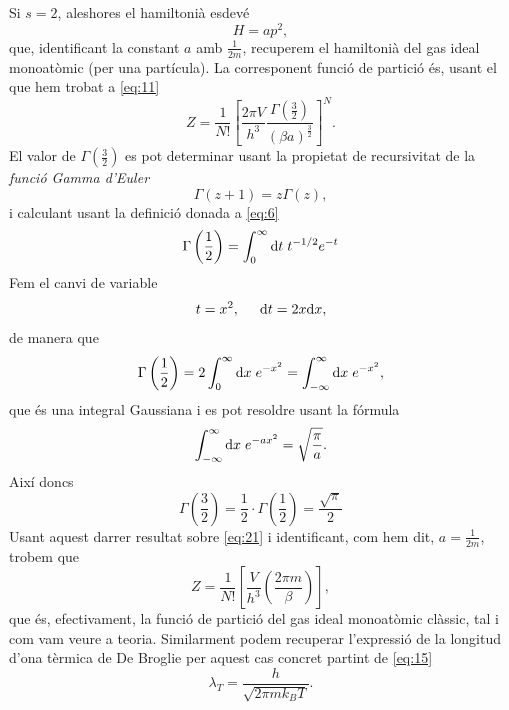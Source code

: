 \documentclass[a4paper, 10pt]{article}
\begin{document}
Si $s=2$, aleshores el hamiltonià esdevé 
\begin{equation}
	H = ap^2,
\end{equation}
que, identificant la constant $a$ amb $\frac{1}{2m}$, recuperem el hamiltonià del gas ideal monoatòmic (per una partícula). La corresponent funció de partició és, usant el que hem trobat a \eqref{eq:11}
\begin{equation}
	Z = \frac{1}{N!}\left[\frac{2\pi V}{h^3}\frac{\Gamma(\frac{3}{2})}{(\beta a)^\frac{3}{2}}\right]^N. \label{eq:21}
\end{equation}
El valor de $\Gamma(\frac{3}{2})$ es pot determinar usant la propietat de recursivitat de la \textit{funció Gamma d'Euler}
\begin{equation}
	\Gamma(z+1)=z\Gamma(z),
\end{equation}
i calculant usant la definició donada a \eqref{eq:6}
\begin{equation*}
	\Gamma\left(\frac{1}{2}\right) = \int_0^\infty \mathrm{d}t \hspace{0.1cm} t^{-1/2}e^{-t}
\end{equation*}
Fem el canvi de variable
\begin{equation*}
	t = x^2, \hspace{0.5cm} \mathrm{d}t = 2x\mathrm{d}x,
\end{equation*}
de manera que 
\begin{equation}
	\Gamma\left(\frac{1}{2}\right) = 2\int_0^\infty \mathrm{d}x\hspace{0.1cm} e^{-x^2} = \int_{-\infty}^\infty \mathrm{d}x\hspace{0.1cm} e^{-x^2}, 
\end{equation}
que és una integral Gaussiana i es pot resoldre usant la fórmula
\begin{equation}
	\int_{-\infty}^{\infty} \mathrm{d}x\hspace{0.1cm} e^{-ax^2} = \sqrt{\frac{\pi}{a}}.
\end{equation}
Així doncs
\begin{equation}
	\Gamma\left(\frac{3}{2}\right) = \frac{1}{2}\cdot\Gamma\left(\frac{1}{2}\right) = \frac{\sqrt{\pi}}{2}
\end{equation}
Usant aquest darrer resultat sobre \eqref{eq:21} i identificant, com hem dit, $a=\frac{1}{2m}$, trobem que
\begin{equation}
	Z = \frac{1}{N!}\left[\frac{V}{h^3}\left(\frac{2\pi m}{\beta}\right)\right],
\end{equation}
que és, efectivament, la funció de partició del gas ideal monoatòmic clàssic, tal i com vam veure a teoria. Similarment podem recuperar l'expressió de la longitud d'ona tèrmica de De Broglie per aquest cas concret partint de \eqref{eq:15}
\begin{equation}
	\lambda_T = \frac{h}{\sqrt{2\pi mk_BT}}.
\end{equation}
\end{document}
